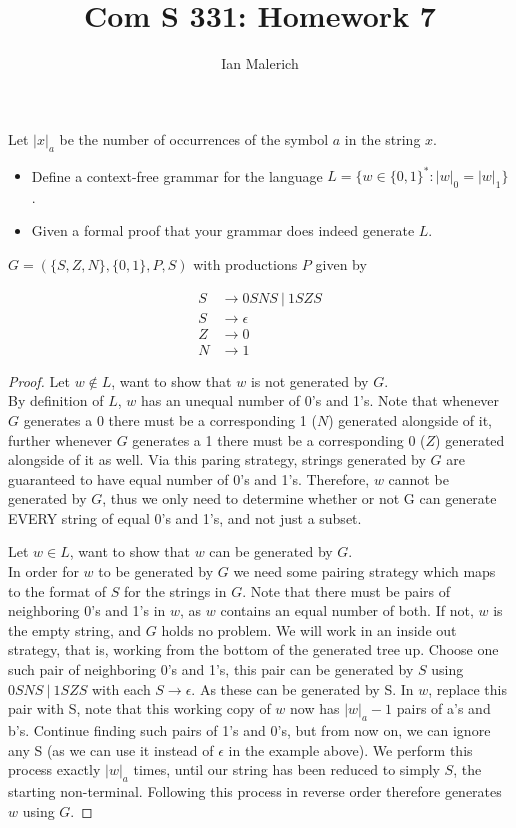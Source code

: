 \documentclass[12pt]{jhwhw}
\author{Ian Malerich}
\title{Com S 331: Homework 7}
\begin{document}
\raggedright

\problem{}

	Let $|x|_a$ be the number of occurrences of the symbol $a$ in the string $x$.
	\begin{itemize}
		\item 
			Define a context-free grammar for the language
			$L = \{w\in \{0,1\}^* : |w|_0 = |w|_1\}$.
		\item
			Given a formal proof that your grammar does indeed generate $L$.
	\end{itemize}

\solution

	$G = (\{S, Z, N\}, \{0,1\}, P, S)$ with productions $P$ given by

	\begin{align*}
		S &\rightarrow 0SNS\ |\ 1SZS \\
		S &\rightarrow \epsilon \\
		Z &\rightarrow 0 \\
		N &\rightarrow 1
	\end{align*}

	\begin{proof} 
		Let $w \not\in L$, want to show that $w$ is not generated by $G$. \\
		By definition of $L$, $w$ has an unequal number of 0's and 1's.
		Note that whenever $G$ generates a 0 there must be a corresponding 1 ($N$) generated
		alongside of it, further whenever $G$ generates a 1 there must be a corresponding
		0 ($Z$) generated alongside of it as well. Via this paring strategy, strings
		generated by $G$ are guaranteed to have equal number of 0's and 1's.
		Therefore, $w$ cannot be generated by $G$, thus we only need to determine
		whether or not G can generate EVERY string of equal 0's and 1's, and not just a subset.

		Let $w \in L$, want to show that $w$ can be generated by $G$. \\
		In order for $w$ to be generated by $G$ we need some pairing strategy 
		which maps to the format of $S$ for the strings in $G$. Note that there
		must be pairs of neighboring 0's and 1's in $w$, as $w$ contains an equal number
		of both. If not, $w$ is the empty string, and $G$ holds no problem. We will work
		in an inside out strategy, that is, working from the bottom of the generated tree
		up. Choose one such pair of neighboring 0's and 1's, this pair can be generated
		by $S$ using $0SNS\ |\ 1SZS$ with each $S\rightarrow \epsilon$. As these can be generated
		by S. In $w$, replace this pair with S, note that this working copy of $w$ now
		has $|w|_a-1$ pairs of a's and b's. Continue finding such pairs of 1's and 0's,
		but from now on, we can ignore any S (as we can use it instead of $\epsilon$ in the example
		above). We perform this process exactly $|w|_a$ times, until our string has been
		reduced to simply $S$, the starting non-terminal. Following this process in reverse
		order therefore generates $w$ using $G$.


	\end{proof}
\end{document}
